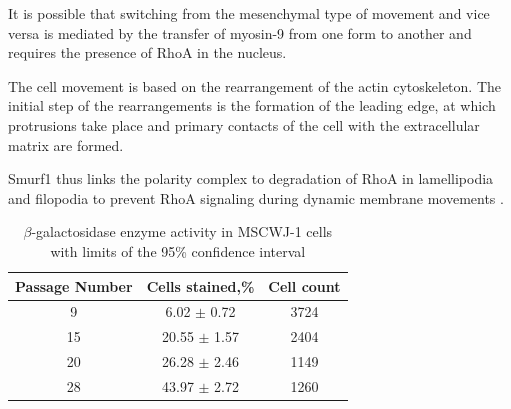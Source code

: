 \documentclass[alpha-refs]{wiley-article}
\begin{document}
It is possible that switching from the mesenchymal type of movement and vice versa is mediated by the transfer of myosin-9 from one form to another and requires the presence of RhoA in the nucleus.

The cell movement is based on the rearrangement of the actin cytoskeleton. The initial step of the rearrangements is the formation of the leading edge, at which protrusions take place and primary contacts of the cell with the extracellular matrix are formed.

Smurf1 thus links the polarity complex to degradation of RhoA in lamellipodia and filopodia to prevent RhoA signaling during dynamic membrane movements \cite{wang2003regulation}.

\begin{table}[hbt!]
  \caption{$\beta$-galactosidase enzyme activity in MSCWJ-1 cells with limits of the 95\% confidence interval}
  \label{tab}
\centering
\begin{tabular}{c|c|c}
 Passage Number & Cells stained,\% & Cell count  \\
 \hline
 9 & 6.02 $\pm$ 0.72 & 3724 \\
 15 & 20.55 $\pm$ 1.57 & 2404 \\
 20 & 26.28 $\pm$ 2.46 & 1149  \\
 28 & 43.97 $\pm$ 2.72 & 1260
\end{tabular}
\end{table}

\fi

\iffalse
\author[1\authfn{1}]{Author One PhD}
\author[2\authfn{1}]{Author A.~Two MD}
\author[2\authfn{2}]{Author Three PhD}
\author[2]{Author B.~Four}





\end{document}
